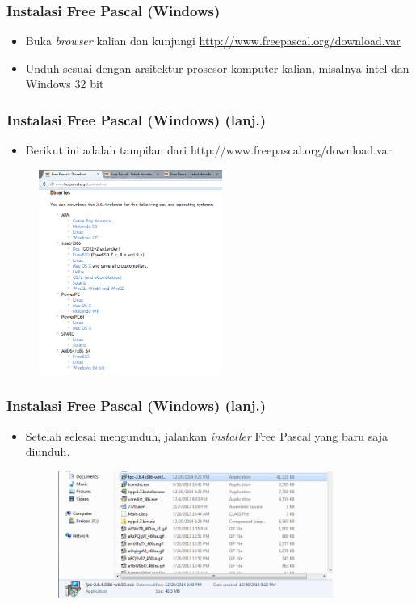 \begin{frame}
\frametitle{Instalasi Free Pascal (Windows)}
\begin{itemize}
  \item Buka \textit{browser} kalian dan kunjungi \href{http://www.freepascal.org/download.var}{http://www.freepascal.org/download.var}
  \item Unduh sesuai dengan arsitektur prosesor komputer kalian, misalnya intel dan Windows 32 bit
\end{itemize}
\end{frame}

\begin{frame}
\frametitle{Instalasi Free Pascal (Windows) (lanj.)}
\begin{itemize}
  \item Berikut ini adalah tampilan dari http://www.freepascal.org/download.var
\end{itemize}
\begin{figure}
  \includegraphics[width=6cm]{asset/dl_list1.PNG}
\end{figure}
\end{frame}

\begin{frame}
\frametitle{Instalasi Free Pascal (Windows) (lanj.)}
\begin{itemize}
  \item Setelah selesai mengunduh, jalankan \textit{installer} Free Pascal yang baru saja diunduh.
  \begin{figure}
    \includegraphics[width=9cm]{asset/fpc_1.PNG}
  \end{figure}
\end{itemize}
\end{frame}

